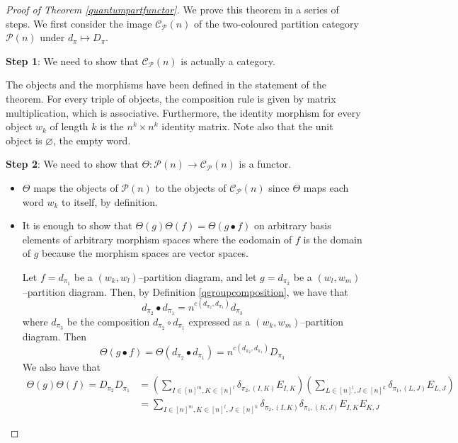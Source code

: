 \documentclass{article}
\theoremstyle{plain}
\theoremstyle{definition}
\theoremstyle{remark}
\begin{document}
\begin{proof}[Proof of Theorem \ref{quantumpartfunctor}]
	We prove this theorem in a series of steps.
	We first consider the image $\mathcal{C}_{\mathcal{P}}(n)$ of
	the two-coloured partition category $\mathcal{P}(n)$ 
	under $d_\pi \mapsto D_\pi$.

	\textbf{Step 1}: We need to show that $\mathcal{C}_{\mathcal{P}}(n)$
	is actually a category. 

	The objects and the morphisms have been defined in the statement of the theorem.
	For every triple of objects, the composition rule is given by matrix 
	multiplication, which is associative.
	Furthermore, the identity morphism for every object $w_k$ of length $k$ is the 
	$n^k \times n^k$ identity matrix.
	Note also that the unit object is $\varnothing$, the empty word.

	\textbf{Step 2}: We need to show that $\Theta : \mathcal{P}(n) \rightarrow \mathcal{C}_{\mathcal{P}}(n)$ is a functor.

	\begin{itemize}
		\item $\Theta$ maps the objects of $\mathcal{P}(n)$ to the objects of
			$\mathcal{C}_{\mathcal{P}}(n)$ since 
			$\Theta$ maps each word $w_k$ to itself, by definition.
		\item It is enough to show that $\Theta(g)\Theta(f) = \Theta(g \bullet f)$ on arbitrary basis elements of arbitrary morphism spaces where
			the codomain of $f$ is the domain of $g$
			because the morphism spaces are vector spaces. 

			Let $f = d_{\pi_1}$ be a $(w_k,w_l)$--partition diagram, and
			let $g = d_{\pi_2}$ be a $(w_l,w_m)$--partition diagram.
			Then, by Definition \ref{qgroupcomposition}, we have that
			\begin{equation}
				d_{\pi_2} \bullet d_{\pi_1} 
				=
				n^{c(d_{\pi_2}, d_{\pi_1})} d_{\pi_3}
			\end{equation}
			where $d_{\pi_3}$ be the composition $d_{\pi_2} \circ d_{\pi_1}$
			expressed as a $(w_k,w_m)$--partition diagram.
			Then 
			\begin{equation} \label{partbulletmatmult}
				\Theta(g \bullet f) 
				= 
				\Theta(d_{\pi_2} \bullet d_{\pi_1}) 
				=
				n^{c(d_{\pi_2}, d_{\pi_1})} D_{\pi_3}
			\end{equation}
			We also have that
			\begin{align}
				\Theta(g)\Theta(f)
				=
				D_{\pi_2}D_{\pi_1}
				& =
				\left(
				\sum_{I \in [n]^m, K \in [n]^l}
				\delta_{\pi_2, (I,K)}
				E_{I,K}
				\right)
				\left(
				\sum_{L \in [n]^l, J \in [n]^k}
				\delta_{\pi_1, (L,J)}
				E_{L,J} 
				\right)
				\\
				& =
				\sum_{I \in [n]^m, K \in [n]^l, J \in [n]^k}
				\delta_{\pi_2, (I,K)}
				\delta_{\pi_1, (K,J)}
				E_{I,K}E_{K,J} \label{partcompmultmat}
			\end{align}


\end{itemize}
\end{proof}
\end{document}
